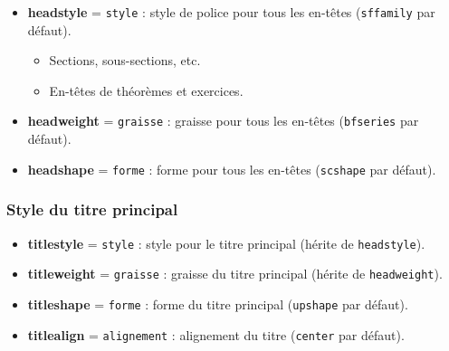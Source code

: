 \documentclass[
    french,
    margin=2cm
]{neoschool}
\begin{document}
\begin{itemize}
\item \textbf{headstyle} = \texttt{style} : style de police
  pour tous les en-têtes (\texttt{sffamily} par défaut).
  \begin{itemize}
  \item Sections, sous-sections, etc.
  \item En-têtes de théorèmes et exercices.
  \end{itemize}
\item \textbf{headweight} = \texttt{graisse} : graisse pour
  tous les en-têtes (\texttt{bfseries} par défaut).
\item \textbf{headshape} = \texttt{forme} : forme pour tous
  les en-têtes (\texttt{scshape} par défaut).
\end{itemize}

\subsubsection{Style du titre principal}

\begin{itemize}
\item \textbf{titlestyle} = \texttt{style} : style pour le
  titre principal (hérite de \texttt{headstyle}).
\item \textbf{titleweight} = \texttt{graisse} : graisse du
  titre principal (hérite de \texttt{headweight}).
\item \textbf{titleshape} = \texttt{forme} : forme du titre
  principal (\texttt{upshape} par défaut).
\item \textbf{titlealign} = \texttt{alignement} :
  alignement du titre (\texttt{center} par défaut).
\end{itemize}

\end{document}

